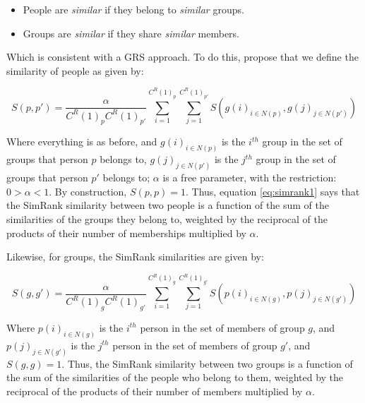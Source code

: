 \documentclass[a4paper,fleqn]{cas-sc}
\begin{document}
\begin{itemize}
    \item People are \textit{similar} if they belong to \textit{similar} groups.
    \item Groups are \textit{similar} if they share \textit{similar} members.
\end{itemize}

Which is consistent with a GRS approach. To do this, \citet[540, eq2 and eq3]{jeh2002simrank} propose that we define the similarity of people as given by:

\begin{equation}
    S(p, p') = \frac{\alpha}{C^R(1)_pC^R(1)_{p'}}
    \sum_{i = 1}^{C^R(1)_p} \sum_{j = 1}^{C^R(1)_{p'}} 
    S\left(g(i)_{i \in N(p)}, g(j)_{j \in N(p')}\right)
    \label{eq:simrank1}
\end{equation}

Where everything is as before, and $g(i)_{i \in N(p)}$ is the $i^{th}$ group in the set of groups that person $p$ belongs to, $g(j)_{j \in N(p')}$ is the $j^{th}$ group in the set of groups that person $p'$ belongs to; $\alpha$ is a free parameter, with the restriction: $0 > \alpha < 1$. By construction, $S(p, p) = 1$. Thus, equation \ref{eq:simrank1} says that the SimRank similarity between two people is a function of the sum of the similarities of the groups they belong to, weighted by the reciprocal of the products of their number of memberships multiplied by $\alpha$.

Likewise, for groups, the SimRank similarities are given by:

\begin{equation}
    S(g, g') = \frac{\alpha}{C^R(1)_gC^R(1)_{g'}}
    \sum_{i = 1}^{C^R(1)_g} \sum_{j = 1}^{C^R(1)_{g'}} 
    S\left(p(i)_{i \in N(g)}, p(j)_{j \in N(g')}\right)
    \label{eq:simrank2}
\end{equation}

Where $p(i)_{i \in N(g)}$ is the $i^{th}$ person in the set of members of group $g$, and $p(j)_{j \in N(g')}$ is the $j^{th}$ person in the set of members of group $g'$, and $S(g, g) = 1$. Thus, the SimRank similarity between two groups is a function of the sum of the similarities of the people who belong to them, weighted by the reciprocal of the products of their number of members multiplied by $\alpha$.
\end{document}
